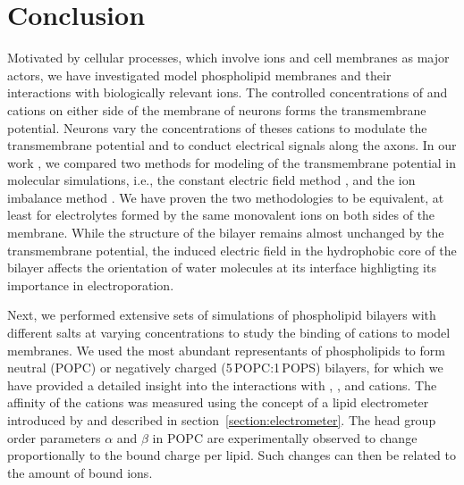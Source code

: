 \chapter*{Conclusion}

Motivated by cellular processes, 
which involve ions and cell membranes as major actors, 
we have investigated model phospholipid membranes and their interactions 
with biologically relevant ions. 
The controlled concentrations of  and  cations 
on either side of the membrane of neurons
forms the transmembrane potential. 
Neurons vary the concentrations of theses cations
to modulate the transmembrane potential 
and to conduct electrical signals along the axons. \citep{Knudsen_book2002, Storace2015, Sung2015}
In our work \citep{melcr16},
we compared two methods for modeling of the transmembrane potential in molecular simulations, 
i.e., 
the constant electric field method \cite{Roux1997,Roux2008, gumbart_constant_2012}, 
and the ion imbalance method \cite{sachs04_potential, kutzner_computational_2011}. 
We have proven the two methodologies to be equivalent, 
at least for electrolytes formed by the same monovalent ions on both sides of the membrane. 
While
the structure of the bilayer remains almost unchanged by the transmembrane potential, 
the induced electric field in the hydrophobic core of the bilayer
affects the orientation of water molecules at its interface 
highligting its importance in electroporation. \citep{bu2017mechanics}


Next,
we performed extensive sets of simulations of phospholipid bilayers
with different salts at varying concentrations
to study the binding of cations to model membranes. 
We used the most abundant representants of phospholipids
to form neutral (POPC) or negatively charged (5\,POPC:1\,POPS) bilayers, 
for which we have provided a detailed insight 
into the interactions with 
, , and  cations. 
The affinity of the cations 
was measured using the concept of a lipid electrometer 
introduced by \citet{seelig87} 
and described in section~\ref{section:electrometer}.
The head group order parameters $\alpha$ and $\beta$ in POPC
are experimentally observed to change
proportionally to the bound charge per lipid. 
Such changes can then be related to the amount of bound ions.

